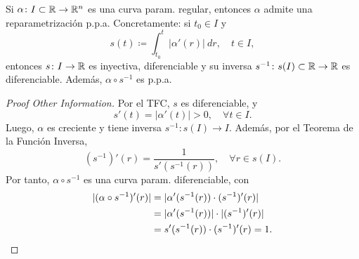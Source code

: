 \begin{prop}
	Si $\alpha \colon I \subset \mathbb{R} \to \mathbb{R}^{n}$ es una curva param. regular, entonces $\alpha$ admite una reparametrización p.p.a. Concretamente: si $t_{0} \in I$ y
	\[ s(t) \coloneq \int_{t_{0}}^{t} |\alpha'(r)| \ dr, \quad t \in I, \]
	entonces $s \colon I \to \mathbb{R}$ es inyectiva, diferenciable y su inversa $s^{-1} \colon s(I) \subset \mathbb{R} \to \mathbb{R}$ es diferenciable. Además, $\alpha \circ s^{-1}$ es p.p.a.
\end{prop}
\begin{proof}[Proof Other Information]
	Por el TFC, $s$ es diferenciable, y
	\[ s'(t) = |\alpha'(t)| > 0, \quad \forall t \in I. \]
	Luego, $\alpha$ es creciente y tiene inversa $s^{-1} \colon s(I) \to I$. Además, por el Teorema de la Función Inversa,
	\[ (s^{-1})'(r) = \frac{1}{s'(s^{-1}(r))},\quad \forall r \in s(I). \]
	Por tanto, $\alpha \circ s^{-1}$ es una curva param. diferenciable, con
	\begin{align*}
		|(\alpha \circ s^{-1})'(r)| &= |\alpha'(s^{-1}(r)) \cdot (s^{-1})'(r)| \\
		&= |\alpha'(s^{-1}(r))| \cdot |(s^{-1})'(r)| \\
		&= s'(s^{-1}(r)) \cdot (s^{-1})'(r) = 1
	.\qedhere\end{align*}
\end{proof}

